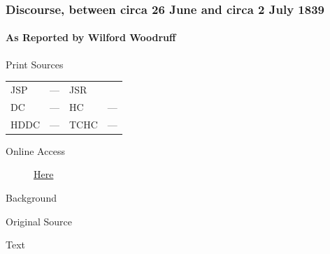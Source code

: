 		\subsubsection{Discourse, between circa 26 June and circa 2 July 1839}
			\label{EMS-1839-JS-CIR-26-JUN-CIR-2-JUL-1839}
			
			\paragraph{As Reported by Wilford Woodruff}
				\label{EMS-1839-JS-CIR-26-JUN-CIR-2-JUL-1839-WW}
				
				\begin{description}
					\item[Print Sources]
				\end{description}

					\begin{tabular}{p{0.5in}p{1in}p{0.5in}p{1in}}
					JSP	 	& ---		& JSR 		&  \\
					DC	 	& ---		& HC 		& --- \\
					HDDC 	& ---		& TCHC 		& --- \\
					\end{tabular}
				
				\begin{description}
					\item[Online Access] \href{https://www.josephsmithpapers.org/paper-summary/discourse-between-circa-26-june-and-circa-2-july-1839-as-reported-by-wilford-woodruff/1}{Here}
				\end{description}
				
				\begin{description}
					\item[Background]
				\end{description}
				
				
				\begin{description}
					\item[Original Source]
				\end{description}
				
				
				\begin{description}
					\item[Text]
				\end{description}
					
